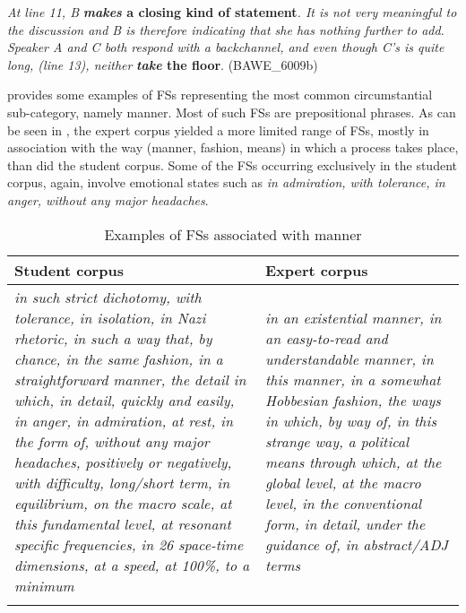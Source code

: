 \documentclass[output=paper]{langscibook}
\begin{document}
\ea \textit{At line 11, B} \textbf{\textit{makes} \textbf{a} \textbf{closing} \textbf{kind} \textbf{of} \textbf{statement}}\textit{. It is not very meaningful to the discussion and B is therefore indicating that she has nothing further to add. Speaker A and C both respond with a backchannel, and even though C’s is quite long, (line 13), neither} \textbf{\textit{take} \textbf{the} \textbf{floor}}. (BAWE\_6009b)
\z

 provides some examples of FSs representing the most common circumstantial sub-category, namely manner. Most of such FSs are prepositional phrases. As can be seen in , the expert corpus yielded a more limited range of FSs, mostly in association with the way (manner, fashion, means) in which a process takes place, than did the student corpus. Some of the FSs occurring exclusively in the student corpus, again, involve emotional states such as \textit{in admiration, with tolerance, in anger, without any major headaches}. 


\begin{table}
\begin{tabularx}{\textwidth}{QQ}
\lsptoprule
Student corpus & Expert corpus\\\midrule
\textit{in such strict dichotomy, with tolerance, in isolation, in Nazi rhetoric, in such a way that, by chance, in the same fashion, in a straightforward manner, the detail in which, in detail, quickly and easily, in anger, in admiration, at rest, in the form of, without any major headaches, positively or negatively, with difficulty, long/short term, in equilibrium, on the macro scale, at this fundamental level, at resonant specific frequencies, in 26 space-time dimensions, at a speed, at 100\%, to a minimum} & \textit{in an existential manner, in an easy-to-read and understandable manner, in this manner, in a somewhat Hobbesian fashion, the ways in which, by way of, in this strange way, a political means through which, at the global level,  at the macro level, in the conventional form, in detail, under the guidance of, in abstract/ADJ terms}\\
\lspbottomrule
\end{tabularx}
\caption{Examples of FSs associated with manner\label{tab:wang:8}}
\end{table}
\end{document}
